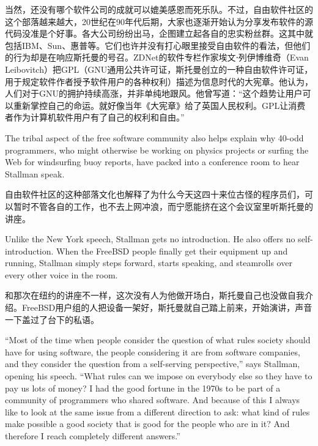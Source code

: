 \ifdefined\chs
当然，还没有哪个软件公司的成就可以媲美感恩而死乐队。不过，自由软件社区的这个部落越来越大，20世纪在90年代后期，大家也逐渐开始认为分享发布软件的源代码没准是个好事。各大公司纷纷出马，企图建立起各自的忠实粉丝群。这其中就包括IBM、Sun、惠普等。它们也许并没有打心眼里接受自由软件的看法，但他们的行为却是在响应斯托曼的号召。ZDNet的软件专栏作家埃文⋅列伊博维奇（Evan Leibovitch）把GPL（GNU通用公共许可证，斯托曼创立的一种自由软件许可证，用于规定软件作者授予软件用户的各种权利）描述为信息时代的大宪章。他认为，人们对于GNU的拥护持续高涨，并非单纯地跟风。他曾写道：``这个趋势让用户可以重新掌控自己的命运。就好像当年《大宪章》给了英国人民权利。GPL让消费者作为计算机软件用户有了自己的权利和自由。''
\fi

\ifdefined\eng
The tribal aspect of the free software community also helps explain why 40-odd programmers, who might otherwise be working on physics projects or surfing the Web for windsurfing buoy reports, have packed into a conference room to hear Stallman speak.
\fi

\ifdefined\chs
自由软件社区的这种部落文化也解释了为什么今天这四十来位古怪的程序员们，可以暂时不管各自的工作，也不去上网冲浪，而宁愿能挤在这个会议室里听斯托曼的讲座。
\fi

\ifdefined\eng
Unlike the New York speech, Stallman gets no introduction. He also offers no self-introduction. When the FreeBSD people finally get their equipment up and running, Stallman simply steps forward, starts speaking, and steamrolls over every other voice in the room.
\fi

\ifdefined\chs
和那次在纽约的讲座不一样，这次没有人为他做开场白，斯托曼自己也没做自我介绍。FreeBSD用户组的人把设备一架好，斯托曼就自己踏上前来，开始演讲，声音一下盖过了台下的私语。
\fi

\ifdefined\eng
``Most of the time when people consider the question of what rules society should have for using software, the people considering it are from software companies, and they consider the question from a self-serving perspective,'' says Stallman, opening his speech. ``What rules can we impose on everybody else so they have to pay us lots of money? I had the good fortune in the 1970s to be part of a community of programmers who shared software. And because of this I always like to look at the same issue from a different direction to ask: what kind of rules make possible a good society that is good for the people who are in it? And therefore I reach completely different answers.''
\fi

